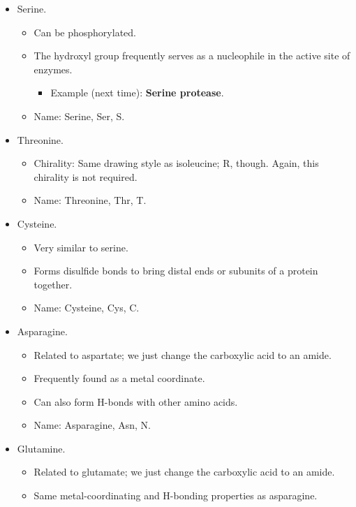 \documentclass[../notes.tex]{subfiles}
\begin{document}
\begin{itemize}
\begin{itemize}
        \item Serine.
        \begin{itemize}
            \item Can be phosphorylated.
            \item The hydroxyl group frequently serves as a nucleophile in the active site of enzymes.
            \begin{itemize}
                \item Example (next time): \textbf{Serine protease}.
            \end{itemize}
            \item Name: Serine, Ser, S.
        \end{itemize}
        \item Threonine.
        \begin{itemize}
            \item Chirality: Same drawing style as isoleucine; R, though. Again, this chirality is not required.
            \item Name: Threonine, Thr, T.
        \end{itemize}
        \item Cysteine.
        \begin{itemize}
            \item Very similar to serine.
            \item Forms disulfide bonds to bring distal ends or subunits of a protein together.
            \item Name: Cysteine, Cys, C.
        \end{itemize}
        \item Asparagine.
        \begin{itemize}
            \item Related to aspartate; we just change the carboxylic acid to an amide.
            \item Frequently found as a metal coordinate.
            \item Can also form H-bonds with other amino acids.
            \item Name: Asparagine, Asn, N.
        \end{itemize}
        \item Glutamine.
        \begin{itemize}
            \item Related to glutamate; we just change the carboxylic acid to an amide.
            \item Same metal-coordinating and H-bonding properties as asparagine.

\end{itemize}
\end{itemize}
\end{itemize}
\end{document}
